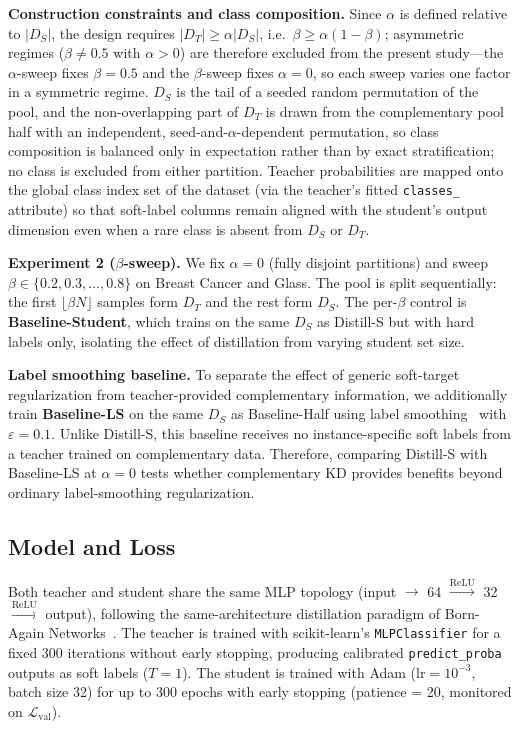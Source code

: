 \documentclass[a4paper,fleqn]{cas-dc}
\begin{document}
\textbf{Construction constraints and class composition.}
Since $\alpha$ is defined relative to $|D_S|$, the design requires
$|D_T| \ge \alpha |D_S|$, i.e.\ $\beta \ge \alpha(1-\beta)$; asymmetric
regimes ($\beta \neq 0.5$ with $\alpha > 0$) are therefore excluded from
the present study---the $\alpha$-sweep fixes $\beta=0.5$ and the
$\beta$-sweep fixes $\alpha=0$, so each sweep varies one factor in a
symmetric regime. $D_S$ is the tail of a seeded random permutation of the
pool, and the non-overlapping part of $D_T$ is drawn from the complementary
pool half with an independent, seed-and-$\alpha$-dependent permutation, so
class composition is balanced only in expectation rather than by exact
stratification; no class is excluded from either partition. Teacher
probabilities are mapped onto the global class index set of the dataset
(via the teacher's fitted \texttt{classes\_} attribute) so that soft-label
columns remain aligned with the student's output dimension even when a
rare class is absent from $D_S$ or $D_T$.

\textbf{Experiment 2 ($\beta$-sweep).}
We fix $\alpha = 0$ (fully disjoint partitions) and sweep
$\beta \in \{0.2, 0.3, \ldots, 0.8\}$ on Breast Cancer and Glass.
The pool is split sequentially: the first $\lfloor\beta N\rfloor$
samples form $D_T$ and the rest form $D_S$.
The per-$\beta$ control is \textbf{Baseline-Student}, which trains
on the same $D_S$ as Distill-S but with hard labels only,
isolating the effect of distillation from varying student set size.

\textbf{Label smoothing baseline.}
To separate the effect of generic soft-target regularization from
teacher-provided complementary information, we additionally train
\textbf{Baseline-LS} on the same $D_S$ as Baseline-Half using label
smoothing~\citep{szegedy2016rethinking} with $\varepsilon=0.1$.
Unlike Distill-S, this baseline receives no instance-specific soft labels
from a teacher trained on complementary data. Therefore, comparing
Distill-S with Baseline-LS at $\alpha=0$ tests whether complementary KD
provides benefits beyond ordinary label-smoothing regularization.

\subsection{Model and Loss}

Both teacher and student share the same MLP topology
(input $\to$ 64 $\xrightarrow{\mathrm{ReLU}}$ 32
$\xrightarrow{\mathrm{ReLU}}$ output), following the
same-architecture distillation paradigm of
Born-Again Networks~\citep{furlanello2018born}.
The teacher is trained with scikit-learn's \texttt{MLPClassifier}
for a fixed 300 iterations without early stopping, producing
calibrated \texttt{predict\_proba} outputs as soft labels ($T=1$).
The student is trained with Adam ($\mathrm{lr}=10^{-3}$,
batch size 32) for up to 300 epochs with early stopping
(patience = 20, monitored on $\mathcal{L}_{\mathrm{val}}$).
\end{document}
